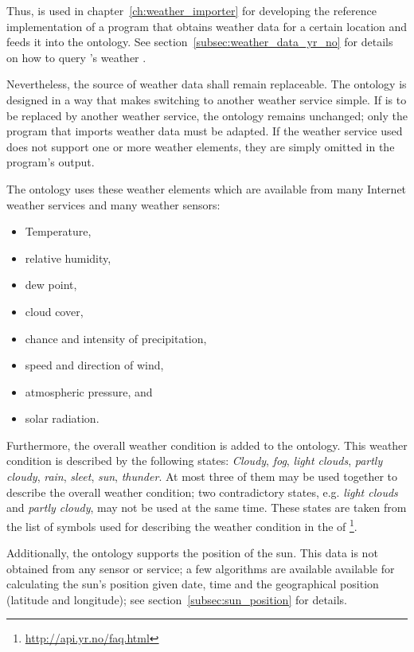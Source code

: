 Thus, \yrno is used in chapter~\ref{ch:weather_importer} for developing the reference implementation of a program that obtains weather data for a certain location and feeds it into the \thinkhomeweather ontology. See section~\ref{subsec:weather_data_yr_no} for details on how to query \yrno's weather .

Nevertheless, the source of weather data shall remain replaceable. The ontology is designed in a way that makes switching to another weather service simple. If \yrno is to be replaced by another weather service, the ontology remains unchanged; only the program that imports weather data must be adapted. If the weather service used does not support one or more weather elements, they are simply omitted in the program's output.

The ontology uses these weather elements which are available from many Internet weather services and many weather sensors:
\begin{itemize}
  \item Temperature,
  \item relative humidity,
  \item dew point,
  \item cloud cover,
  \item chance and intensity of precipitation,
  \item speed and direction of wind,
  \item atmospheric pressure, and
  \item solar radiation.
\end{itemize}

Furthermore, the overall weather condition is added to the ontology. This weather condition is described by the following states: \emph{Cloudy}, \emph{fog}, \emph{light clouds}, \emph{partly cloudy}, \emph{rain}, \emph{sleet}, \emph{sun}, \emph{thunder}. At most three of them may be used together to describe the overall weather condition; two contradictory states, e.g. \emph{light clouds} and \emph{partly cloudy}, may not be used at the same time. These states are taken from the list of symbols used for describing the weather condition in the  of \yrno\footnote{\href{http://api.yr.no/faq.html}{http://api.yr.no/faq.html}}.

Additionally, the ontology supports the position of the sun. This data is not obtained from any sensor or service; a few algorithms are available available for calculating the sun's position given date, time and the geographical position (latitude and longitude); see section~\ref{subsec:sun_position} for details.

